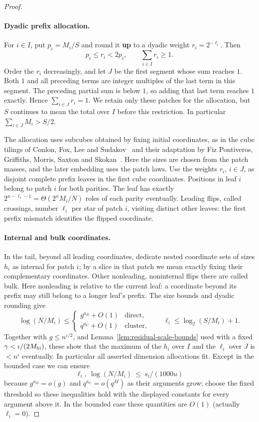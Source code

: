 \begin{proof}
\paragraph{Dyadic prefix allocation.}
For \(i\in I\), put \(p_i=M_i/S\) and round it \textbf{up} to a dyadic
weight \(r_i=2^{-\ell_i}\). Then
\[
p_i\le r_i<2p_i,\qquad \sum_{i\in I}r_i\ge1.
\]
Order the \(r_i\) decreasingly, and let \(J\) be the first segment whose
sum reaches \(1\). Both \(1\) and all preceding terms are integer multiples
of the last term in this segment. The preceding partial sum is below \(1\),
so adding that last term reaches \(1\) exactly. Hence
\(\sum_{i\in J}r_i=1\). We retain only these patches for the allocation,
but \(S\) continues to mean the total over \(I\) before this restriction.
In particular \(\sum_{i\in J}M_i>S/2\).

The allocation uses subcubes obtained by fixing initial coordinates, as in
the cube tilings of Conlon, Fox, Lee and
Sudakov~\cite[Section~2.2]{conlon-fox-lee-sudakov2016} and their adaptation
by Fiz Pontiveros, Griffiths, Morris, Saxton and
Skokan~\cite[Section~2]{fiz-pontiveros-griffiths-morris-saxton-skokan2016}.
Here the sizes are chosen from the patch masses, and the later embedding
uses the patch laws. Use the weights \(r_i\), \(i\in J\), as disjoint
complete prefix leaves in the first cube coordinates. Positions in leaf
\(i\) belong to patch \(i\) for both parities. The leaf has exactly
\(2^{n-\ell_i-1}=\Theta(2^nM_i/N)\) roles of each parity eventually.
Leading flips, called crossings, number \(\ell_i\) per star of patch
\(i\), visiting distinct other leaves: the first prefix mismatch identifies
the flipped coordinate.

\paragraph{Internal and bulk coordinates.}
In the tail, beyond all leading coordinates, dedicate nested coordinate
sets of sizes \(h_i\) as internal for patch \(i\); by a slice in that patch
we mean exactly fixing their complementary coordinates. Other nonleading,
noninternal flips there are called bulk. Here nonleading is relative to the
current leaf: a coordinate beyond its prefix may still belong to a longer
leaf's prefix. The size bounds and dyadic rounding give
\[
 \log(N/M_i)\le
 \begin{cases}g^{a_B}+O(1)&\text{direct},\\q^{a_C}+O(1)&\text{cluster},\end{cases}
 \qquad \ell_i\le\log_2(S/M_i)+1.
\]
Together with \(g\le n^{\iota/2}\), and Lemma~\ref{lem:residual-scale-bounds} used with a fixed \(\gamma<\iota/(2M_{\rm hi})\), these show that the maximum of the \(h_i\) over \(I\) and the \(\ell_i\) over \(J\) is \(<n^\iota\) eventually. In particular all asserted
dimension allocations fit. Except in the bounded case we can ensure
\[
 \ell_i,\ \log(N/M_i)\ \le\ s_i/(1000u)
\]
because \(g^{a_B}=o(g)\) and \(q^{a_C}=o(q^M)\) as their arguments grow; choose the fixed threshold so these inequalities hold with the displayed constants for every argument above it. In the bounded case these quantities are \(O(1)\) (actually \(\ell_i=0\)).
\end{proof}

